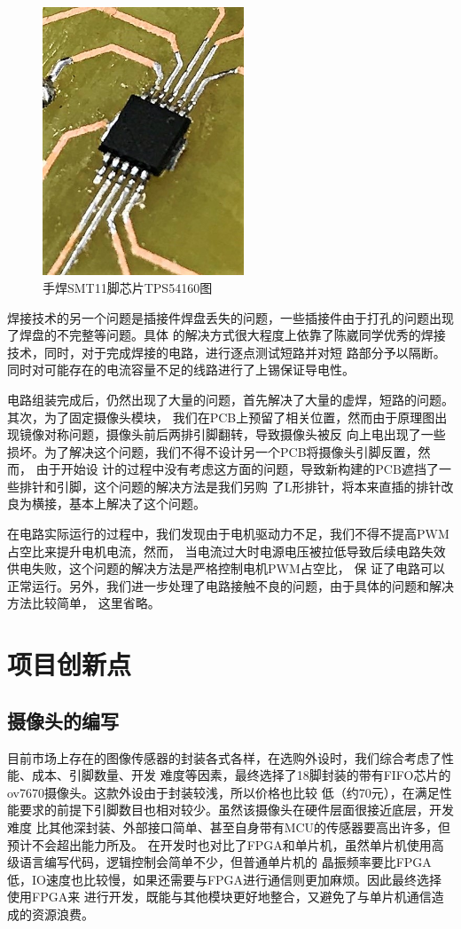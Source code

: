 \documentclass[a4paper]{paper}
\begin{document}
\begin{figure}
    \centering
    \includegraphics[width = 60mm]{SMT.jpg}
    \caption{手焊SMT11脚芯片TPS54160图}
    \label{ex}
\end{figure}
焊接技术的另一个问题是插接件焊盘丢失的问题，一些插接件由于打孔的问题出现了焊盘的不完整等问题。具体
的解决方式很大程度上依靠了陈崴同学优秀的焊接技术，同时，对于完成焊接的电路，进行逐点测试短路并对短
路部分予以隔断。同时对可能存在的电流容量不足的线路进行了上锡保证导电性。

电路组装完成后，仍然出现了大量的问题，首先解决了大量的虚焊，短路的问题。其次，为了固定摄像头模块，
我们在PCB上预留了相关位置，然而由于原理图出现镜像对称问题，摄像头前后两排引脚翻转，导致摄像头被反
向上电出现了一些损坏。为了解决这个问题，我们不得不设计另一个PCB将摄像头引脚反置，然而， 由于开始设
计的过程中没有考虑这方面的问题，导致新构建的PCB遮挡了一些排针和引脚，这个问题的解决方法是我们另购
了L形排针，将本来直插的排针改良为横接，基本上解决了这个问题。

在电路实际运行的过程中，我们发现由于电机驱动力不足，我们不得不提高PWM占空比来提升电机电流，然而，
当电流过大时电源电压被拉低导致后续电路失效供电失败，这个问题的解决方法是严格控制电机PWM占空比， 保
证了电路可以正常运行。另外，我们进一步处理了电路接触不良的问题，由于具体的问题和解决方法比较简单，
这里省略。
\section{项目创新点}
\subsection{摄像头的编写}
目前市场上存在的图像传感器的封装各式各样，在选购外设时，我们综合考虑了性能、成本、引脚数量、开发
难度等因素，最终选择了18脚封装的带有FIFO芯片的ov7670摄像头。这款外设由于封装较浅，所以价格也比较
低（约70元），在满足性能要求的前提下引脚数目也相对较少。虽然该摄像头在硬件层面很接近底层，开发难度
比其他深封装、外部接口简单、甚至自身带有MCU的传感器要高出许多，但预计不会超出能力所及。
在开发时也对比了FPGA和单片机，虽然单片机使用高级语言编写代码，逻辑控制会简单不少，但普通单片机的
晶振频率要比FPGA低，IO速度也比较慢，如果还需要与FPGA进行通信则更加麻烦。因此最终选择使用FPGA来
进行开发，既能与其他模块更好地整合，又避免了与单片机通信造成的资源浪费。
\end{document}
